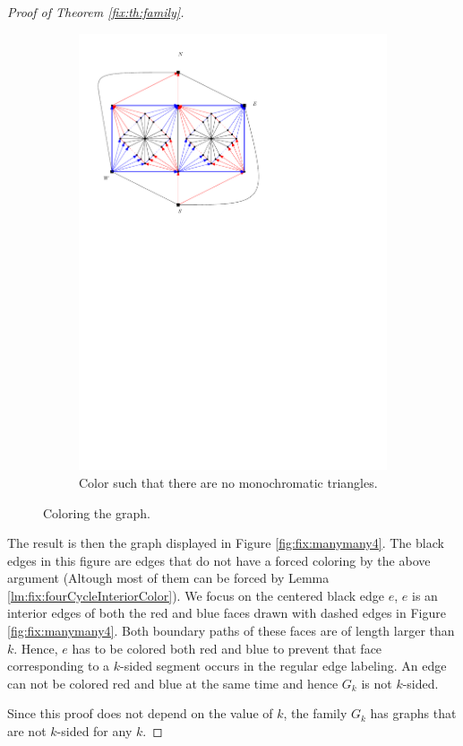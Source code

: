 \begin{proof}[Proof of Theorem \ref{fix:th:family}]
\begin{figure}[h]
\begin{subfigure}[t]{0.3\textwidth}
      \includegraphics[width=\textwidth]{fixExtension/img/manymany3}
      \caption{Color such that there are no monochromatic triangles.}
      \label{fig:fix:manymany3}
    \end{subfigure}
    \caption{Coloring the graph.}
    \label{fig:fix:coloring}
  \end{figure}

  The result is then the graph displayed in Figure \ref{fig:fix:manymany4}. The black edges in this figure are edges that do not have a forced coloring by the above argument (Altough most of them can be forced by Lemma \ref{lm:fix:fourCycleInteriorColor}).
  We focus on the centered black edge $e$, $e$ is an interior edges of both the red and blue faces drawn with dashed edges in Figure \ref{fig:fix:manymany4}. Both boundary paths of these faces are of length larger than $k$. Hence, $e$ has to be colored both red and blue to prevent that face corresponding to a $k$-sided segment occurs in the regular edge labeling. An edge can not be colored red and blue at the same time and hence $G_k$ is not $k$-sided.

  Since this proof does not depend on the value of $k$, the family $G_k$ has graphs that are not $k$-sided for any $k$.
\end{proof}


